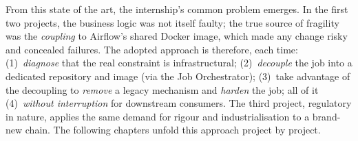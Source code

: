 From this state of the art, the internship's common problem emerges. In the first two projects, the business logic was not itself faulty; the true source of fragility was the \emph{coupling} to Airflow's shared Docker image, which made any change risky and concealed failures. The adopted approach is therefore, each time: (1)~\emph{diagnose} that the real constraint is infrastructural; (2)~\emph{decouple} the job into a dedicated repository and image (via the Job Orchestrator); (3)~take advantage of the decoupling to \emph{remove} a legacy mechanism and \emph{harden} the job; all of it (4)~\emph{without interruption} for downstream consumers. The third project, regulatory in nature, applies the same demand for rigour and industrialisation to a brand-new chain. The following chapters unfold this approach project by project.
